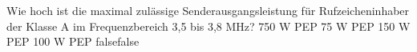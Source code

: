     {Wie hoch ist die maximal zulässige Senderausgangsleistung für Rufzeicheninhaber der Klasse A im Frequenzbereich 3,5 bis 3,8 MHz?}
    {750 W PEP}
    {75 W PEP}
    {150 W PEP}
    {100 W PEP}
    {false}{false}